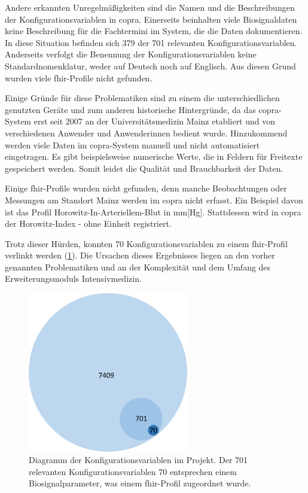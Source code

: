 Andere erkannten Unregelmäßigkeiten sind die Namen und die Beschreibungen der Konfigurationsvariablen in \ac{copra}. Einerseits beinhalten viele Biosignaldaten keine Beschreibung für die Fachtermini im System, die die Daten dokumentieren. In diese Situation befinden sich 379 der 701 relevanten Konfigurationsvariablen. Anderseits verfolgt die Benennung der Konfigurationsvariablen keine Standardnomenklatur, weder auf Deutsch noch auf Englisch. Aus diesen Grund wurden viele \ac{fhir}-Profile nicht gefunden.

Einige Gründe für diese Problematiken sind zu einem die unterschiedlichen genutzten Geräte und zum anderen historische Hintergründe, da das \ac{copra}-System erst seit 2007 an der Universitätsmedizin Mainz etabliert und von verschiedenen Anwender und Anwenderinnen bedient wurde. Hinzukommend werden viele Daten im \ac{copra}-System manuell und nicht automatisiert eingetragen. Es gibt beispielsweise numerische Werte, die in Feldern für Freitexte gespeichert werden. Somit leidet die Qualität und Brauchbarkeit der Daten.

Einige \ac{fhir}-Profile wurden nicht gefunden, denn manche Beobachtungen oder Messungen am Standort Mainz werden im \ac{copra} nicht erfasst. Ein Beispiel davon ist das Profil \glqq Horowitz-In-Arteriellem-Blut\grqq{} in mm[Hg]. Stattdessen wird in \ac{copra} der Horowitz-Index - ohne Einheit registriert.

Trotz dieser Hürden, konnten 70 Konfigurationsvariablen zu einem \ac{fhir}-Profil verlinkt werden (\ref{fig:conf_var}). Die Ursachen dieses Ergebnisses liegen an den vorher genannten Problematiken und an der Komplexität und dem Umfang des Erweiterungsmoduls \glqq Intensivmedizin\grqq{}.

\begin{figure}[ht]
	\centering
	\includegraphics[height=7cm]{figures/config_var}
	\caption[Diagramm der Konfigurationsvariablen im Projekt]{Diagramm der Konfigurationsvariablen im Projekt. Der 701 relevanten Konfigurationsvariablen 70 entsprechen einem Biosignalparameter, was einem \ac{fhir}-Profil zugeordnet wurde.}
	\label{fig:conf_var}
\end{figure}